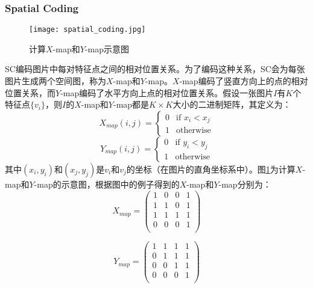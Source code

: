 \subsubsection{Spatial Coding}
\begin{figure}[h]
	\centering
	\texttt{[image: spatial\_coding.jpg]}
	\caption{计算$X$-map和$Y$-map示意图}\label{fig:sc}
\end{figure}
SC编码图片中每对特征点之间的相对位置关系。为了编码这种关系，SC会为每张图片生成两个空间图，称为$X$-map和$Y$-map。$X$-map编码了竖直方向上的点的相对位置关系，而$Y$-map编码了水平方向上点的相对位置关系。假设一张图片$I$有$K$个特征点$\{v_i\}$，则$I$的$X$-map和$Y$-map都是$K \times K$大小的二进制矩阵，其定义为：
\begin{equation}
X_{map}(i,j)=
\begin{cases}
0 & \text{if $x_i < x_j$} \\
1 & \text{otherwise}
\end{cases}
\end{equation}
\begin{equation}
Y_{map}(i,j)=
\begin{cases}
0 & \text{if $y_i < y_j$} \\
1 & \text{otherwise}
\end{cases}
\end{equation}
其中$(x_i,y_i)$和$(x_j,y_j)$是$v_i$和$v_j$的坐标（在图片的直角坐标系中）。图\ref{fig:sc}为计算$X$-map和$Y$-map的示意图，根据图中的例子得到的$X$-map和$Y$-map分别为：
\begin{equation}
X_{map}=
\left(
\begin{array}{cccc}
1 & 0 & 0 & 1 \\
1 & 1 & 0 & 1 \\
1 & 1 & 1 & 1 \\
0 & 0 & 0 & 1 \\
\end{array}
\right)
\end{equation}

\begin{equation}
Y_{map}=
\left(
\begin{array}{cccc}
1 & 1 & 1 & 1 \\
0 & 1 & 1 & 1 \\
0 & 0 & 1 & 1 \\
0 & 0 & 0 & 1 \\
\end{array}
\right)
\end{equation}

